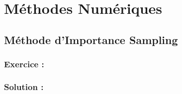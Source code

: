 \chapter{Méthodes Numériques}


\section{Méthode d'Importance Sampling}

\subsection*{Exercice :}

\begin{exerciseBox}

\end{exerciseBox}


\subsection*{Solution :}